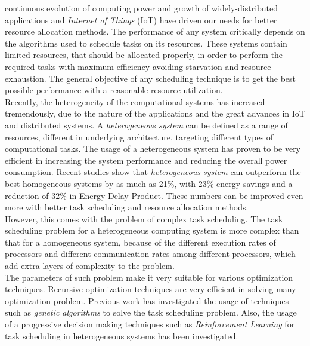  continuous evolution of computing power and growth of widely-distributed applications and \emph{Internet of Things} (IoT) have driven our needs for better resource allocation methods. 
The performance of any system critically depends on the algorithms used to schedule tasks on its resources. These systems contain limited resources, that should be allocated properly, in order to perform the required tasks with maximum efficiency avoiding starvation and resource exhaustion. 
The general objective of any scheduling technique is to get the best possible performance with a reasonable resource utilization. \\ 

Recently, the heterogeneity of the computational systems has increased tremendously, due to the nature of the applications and the great advances in IoT and distributed systems. A \emph{heterogeneous system} can be defined as a range of resources, different in underlying architecture, targeting different types of computational tasks. The usage of a heterogeneous system has proven to be very efficient in increasing the system performance and reducing the overall power consumption. Recent studies \cite{venkat2014harnessing} show that \emph{heterogeneous system} can outperform the best homogeneous systems by as much as 21\%, with 23\% energy savings and
a reduction of 32\% in Energy Delay Product. These numbers can be improved even more with better task scheduling and resource allocation methods. \\

However, this comes with the problem of complex task scheduling. The task scheduling problem for a heterogeneous computing system is more complex than that for a homogeneous system, because of the different execution rates of processors and different communication rates among different processors, which add extra layers of complexity to the problem. \\

The parameters of such problem make it very suitable for various optimization techniques. Recursive optimization techniques are very efficient in solving many optimization problem. Previous work has investigated the usage of techniques such as \emph{genetic algorithms} \cite{article2} to solve the task scheduling problem. Also, the usage of a progressive decision making techniques such as \emph{Reinforcement Learning} \cite{ORHEAN2018292} for task scheduling in heterogeneous systems has been investigated. \\

